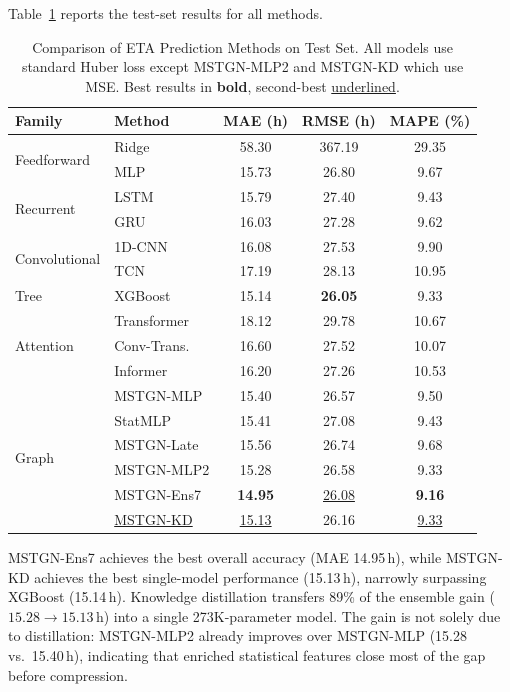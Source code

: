 \documentclass[sigconf,anonymous]{acmart}%
\begin{document}
Table~\ref{tab:main_results} reports the test-set results for all methods.

\begin{table}[t]
    \centering
    \caption{Comparison of ETA Prediction Methods on Test Set. All models use standard Huber loss except MSTGN-MLP2 and MSTGN-KD which use MSE. Best results in \textbf{bold}, second-best \underline{underlined}.}
    \label{tab:main_results}
    \setlength{\tabcolsep}{4pt}
    \begin{tabular}{llccc}
        \toprule
        \textbf{Family} & \textbf{Method} & \textbf{MAE (h)} & \textbf{RMSE (h)} & \textbf{MAPE (\%)} \\
        \midrule
        \multirow{2}{*}{Feedforward} & Ridge & 58.30 & 367.19 & 29.35 \\
        & MLP & 15.73 & 26.80 & 9.67 \\
        \midrule
        \multirow{2}{*}{Recurrent} & LSTM & 15.79 & 27.40 & 9.43 \\
        & GRU & 16.03 & 27.28 & 9.62 \\
        \midrule
        \multirow{2}{*}{Convolutional} & 1D-CNN & 16.08 & 27.53 & 9.90 \\
        & TCN & 17.19 & 28.13 & 10.95 \\
        \midrule
        Tree & XGBoost & 15.14 & \textbf{26.05} & 9.33 \\
        \midrule
        \multirow{3}{*}{Attention} & Transformer & 18.12 & 29.78 & 10.67 \\
        & Conv-Trans. & 16.60 & 27.52 & 10.07 \\
        & Informer & 16.20 & 27.26 & 10.53 \\
        \midrule
        \multirow{7}{*}{Graph} & MSTGN-MLP & 15.40 & 26.57 & 9.50 \\
        & StatMLP & 15.41 & 27.08 & 9.43 \\
        & MSTGN-Late & 15.56 & 26.74 & 9.68 \\
        & MSTGN-MLP2 & 15.28 & 26.58 & 9.33 \\
        & MSTGN-Ens7 & \textbf{14.95} & \underline{26.08} & \textbf{9.16} \\
        & \underline{MSTGN-KD} & \underline{15.13} & 26.16 & \underline{9.33} \\
        \bottomrule
    \end{tabular}
\end{table}

MSTGN-Ens7 achieves the best overall accuracy (MAE 14.95\,h), while MSTGN-KD achieves the best single-model performance (15.13\,h), narrowly surpassing XGBoost (15.14\,h). Knowledge distillation transfers 89\% of the ensemble gain ($15.28 \to 15.13$\,h) into a single 273K-parameter model. The gain is not solely due to distillation: MSTGN-MLP2 already improves over MSTGN-MLP (15.28 vs.\ 15.40\,h), indicating that enriched statistical features close most of the gap before compression.
\end{document}
